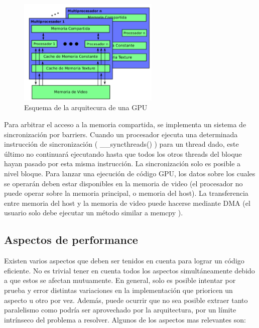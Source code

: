 \documentclass[a4paper,10pt]{report}
\begin{document}
\begin{figure}
  \centering
    \includegraphics[width=0.6\textwidth]{img/arquitectura.png}
  \caption{Esquema de la arquitecura de una GPU}
  \label{arquitectura}
\end{figure}


Para arbitrar el acceso a la memoria compartida, se implementa un sistema de sincronización por barriers. 
Cuando un procesador ejecuta una determinada instrucción de sincronización ( \_\_syncthreads() )
para un thread dado, este último no continuará ejecutando hasta que todos los otros threads del bloque
hayan pasado por esta misma instrucción. La sincronización solo es posible a nivel bloque.
Para lanzar una ejecución de código GPU, los datos sobre los cuales se operarán deben estar disponibles en la memoria de video (el procesador no puede operar sobre la memoria principal, o memoria
del host). La transferencia entre memoria del host y la memoria de video puede hacerse mediante DMA
(el usuario solo debe ejecutar un método similar a memcpy ).





\subsection{Aspectos de performance}
Existen varios aspectos que deben ser tenidos en cuenta para lograr un código eficiente. No es trivial
tener en cuenta todos los aspectos simultáneamente debido a que estos se afectan mutuamente. En
general, solo es posible intentar por prueba y error distintas variaciones en la implementación que
prioricen un aspecto u otro por vez. Además, puede ocurrir que no sea posible extraer tanto paralelismo
como podría ser aprovechado por la arquitectura, por un límite intrínseco del problema a resolver.
Algunos de los aspectos mas relevantes son:
\end{document}
